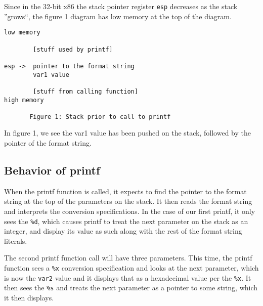 Since in the 32-bit x86 the
stack pointer register {\tt esp} decreases as the stack ''grows``, the
figure 1 diagram has low memory at the top of the diagram.


\begin{verbatim}
low memory

        [stuff used by printf]

esp ->  pointer to the format string
        var1 value

        [stuff from calling function]
high memory

       Figure 1: Stack prior to call to printf
\end{verbatim}

In figure 1, we see the var1 value has been pushed on the
stack, followed by the pointer of the format string.  

\subsection{Behavior of printf}
When the printf function is called, it expects to find the pointer to
the format string at the top of the parameters on the stack.
It then reads the format string and interprets the conversion specifications.
In the case of our first printf, it only sees the {\tt \%d}, which causes
printf to treat the next parameter on the stack as an integer, and display its
value as such along with the rest of the format string literals.

The second printf function call will have three parameters.  This time, the printf function sees a {\tt \%x} conversion 
specification and looks at the next parameter,
which is now the {\tt var2} value and it displays that as a hexadecimal value per the {\tt \%x}.  It then sees the {\tt \%s} and treats the
next parameter as a pointer to some string, which it then displays.

